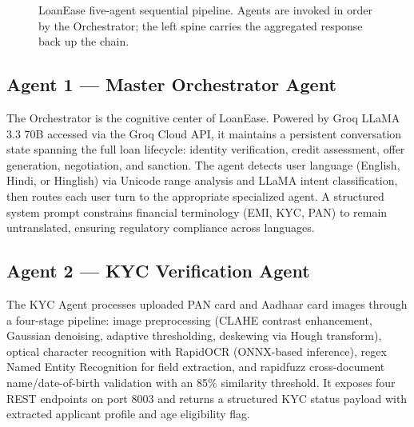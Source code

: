 \documentclass[conference]{IEEEtran}
\begin{document}
\begin{figure}[!ht]
\caption{LoanEase five-agent sequential pipeline. Agents
are invoked in order by the Orchestrator; the left spine
carries the aggregated response back up the chain.}
\label{fig:arch}
\end{figure}

\subsection{Agent 1 — Master Orchestrator Agent}

The Orchestrator is the cognitive center of LoanEase.
Powered by Groq LLaMA 3.3 70B accessed via the Groq
Cloud API, it maintains a persistent conversation state
spanning the full loan lifecycle: identity verification,
credit assessment, offer generation, negotiation, and
sanction. The agent detects user language (English,
Hindi, or Hinglish) via Unicode range analysis and
LLaMA intent classification, then routes each user turn
to the appropriate specialized agent. A structured
system prompt constrains financial terminology (EMI,
KYC, PAN) to remain untranslated, ensuring regulatory
compliance across languages.

\subsection{Agent 2 — KYC Verification Agent}

The KYC Agent processes uploaded PAN card and Aadhaar
card images through a four-stage pipeline: image
preprocessing (CLAHE contrast enhancement, Gaussian
denoising, adaptive thresholding, deskewing via Hough
transform), optical character recognition with
RapidOCR (ONNX-based inference), regex Named Entity
Recognition for field extraction, and rapidfuzz
cross-document name/date-of-birth validation with an
85\% similarity threshold. It exposes four REST
endpoints on port 8003 and returns a structured KYC
status payload with extracted applicant profile and
age eligibility flag.
\end{document}
